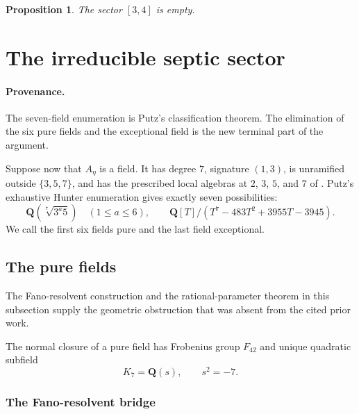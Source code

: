 \documentclass[11pt]{article}
\newcommand{\Q}{\mathbf Q}
\newtheorem{proposition}[theorem]{Proposition}
\theoremstyle{definition}
\theoremstyle{remark}
\begin{document}
\begin{proposition}\label{prop:quartic-sector}
The sector $[3,4]$ is empty.
\end{proposition}

\section{The irreducible septic sector}\label{sec:irreducible}

\paragraph{Provenance.}
The seven-field enumeration is Putz's classification theorem.  The elimination of
the six pure fields and the exceptional field is the new terminal part of the
argument.

Suppose now that $A_\eta$ is a field.  It has degree $7$, signature
$(1,3)$, is unramified outside $\{3,5,7\}$, and has the prescribed
local algebras at $2$, $3$, $5$, and $7$ of
\cite[Corollary~3.4 and Propositions~3.5--3.7]{DahmenSiksek}.
Putz's exhaustive Hunter enumeration
\cite[Theorem~3.50]{Putz} gives exactly seven possibilities:
\begin{equation}\label{eq:seven-fields}
 \Q\!\left(\sqrt[7]{3^a5}\right)\quad(1\leq a\leq6),
 \qquad
 \Q[T]/(T^7-483T^2+3955T-3945).
\end{equation}
We call the first six fields pure and the last field exceptional.

\subsection{The pure fields}

The Fano-resolvent construction and the rational-parameter theorem in this
subsection supply the geometric obstruction that was absent from the cited prior work.

The normal closure of a pure field has Frobenius group $F_{42}$ and unique
quadratic subfield
\[
                              K_7=\Q(s),\qquad s^2=-7.
\]

\subsubsection{The Fano-resolvent bridge}
\end{document}
